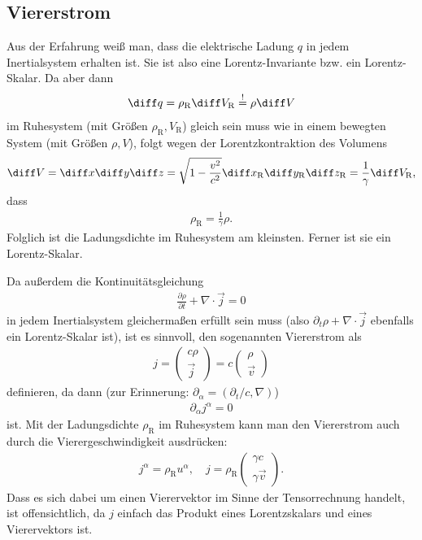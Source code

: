 \subsection{Viererstrom}

Aus der Erfahrung weiß man, dass die elektrische Ladung $q$ in jedem Inertialsystem erhalten ist.
Sie ist also eine Lorentz-Invariante bzw. ein Lorentz-Skalar. Da aber dann
\begin{align*}
    \diff q = \rho_\mathrm{R} \diff V_\mathrm{R} \overset!= \rho \diff V
\end{align*}
im Ruhesystem (mit Größen $\rho_\mathrm{R},V_\mathrm{R}$) gleich sein muss wie in einem bewegten System (mit Größen $\rho,V$),
folgt wegen der Lorentzkontraktion des Volumens
\begin{align*}
    \diff V = \diff x \diff y \diff z = \sqrt{1-\frac{v^2}{c^2}} \diff x_\mathrm{R} \diff y_\mathrm{R} \diff z_\mathrm{R} = \frac{1}{\gamma}\diff V_\mathrm{R},
\end{align*}
dass
\begin{align*}
    \boxed{\rho_\mathrm{R}=\frac{1}{\gamma}\rho.}
\end{align*}
Folglich ist die Ladungsdichte im Ruhesystem am kleinsten. Ferner ist sie ein Lorentz-Skalar.

Da außerdem die Kontinuitätsgleichung
\begin{align*}
    \frac{\partial\rho}{\partial t}+\nabla \cdot\vec j=0
\end{align*}
in jedem Inertialsystem gleichermaßen erfüllt sein muss (also $\partial_t \rho+\nabla\cdot\vec j$ ebenfalls ein Lorentz-Skalar ist),
ist es sinnvoll, den sogenannten Viererstrom als
\begin{align*}
    j=\begin{pmatrix} c\rho\\\vec j\end{pmatrix}=c\begin{pmatrix} \rho\\\vec v\end{pmatrix}
\end{align*}
definieren, da dann (zur Erinnerung: $\partial_\alpha=(\partial_t/c,\nabla)$)
\begin{align*}
    \partial_\alpha j^\alpha = 0
\end{align*}
ist. Mit der Ladungsdichte $\rho_\mathrm{R}$ im Ruhesystem kann man den Viererstrom auch durch die Vierergeschwindigkeit ausdrücken:
\begin{align*}
    j^\alpha=\rho_\mathrm{R} u^\alpha, \quad j=\rho_\mathrm{R} \begin{pmatrix} \gamma c\\\gamma\vec v\end{pmatrix}.
\end{align*}
Dass es sich dabei um einen Vierervektor im Sinne der Tensorrechnung handelt, ist offensichtlich, da $j$ einfach das Produkt eines Lorentzskalars und eines Vierervektors ist.



